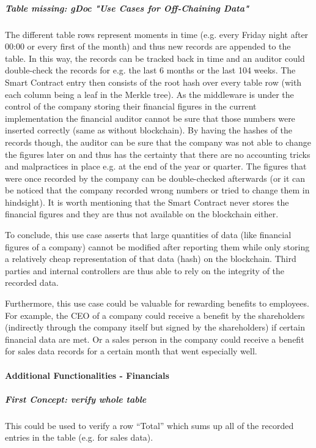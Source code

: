 \subparagraph{Table missing: gDoc "Use Cases for Off-Chaining Data"}

The different table rows represent moments in time (e.g. every Friday night after 00:00 or every first of the month) and thus new records are appended to the table. In this way, the records can be tracked back in time and an auditor could double-check the records for e.g. the last 6 months or the last 104 weeks. The Smart Contract entry then consists of the root hash over every table row (with each column being a leaf in the Merkle tree).
As the middleware is under the control of the company storing their financial figures in the current implementation the financial auditor cannot be sure that those numbers were inserted correctly (same as without blockchain). By having the hashes of the records though, the auditor can be sure that the company was not able to change the figures later on and thus has the certainty that there are no accounting tricks and malpractices in place e.g. at the end of the year or quarter. The figures that were once recorded by the company can be double-checked afterwards (or it can be noticed that the company recorded wrong numbers or tried to change them in hindsight). It is worth mentioning that the Smart Contract never stores the financial figures and they are thus not available on the blockchain either.

To conclude, this use case asserts that large quantities of data (like financial figures of a company) cannot be modified after reporting them while only storing a relatively cheap representation of that data (hash) on the blockchain. Third parties and internal controllers are thus able to rely on the integrity of the recorded data.

Furthermore, this use case could be valuable for rewarding benefits to employees. For example, the CEO of a company could receive a benefit by the shareholders (indirectly through the company itself but signed by the shareholders) if certain financial data are met. Or a sales person in the company could receive a benefit for sales data records for a certain month that went especially well.

\paragraph{Additional Functionalities - Financials}
\subparagraph{First Concept: verify whole table}

This could be used to verify a row “Total” which sums up all of the recorded entries in the table (e.g. for sales data).

